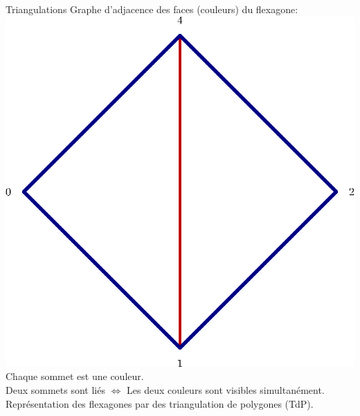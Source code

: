 \documentclass[french,xcolor=dvipsnames]{beamer}
\begin{document}
		\begin{frame}{Triangulations}
			Graphe d'adjacence des faces (couleurs) du flexagone:
			\includegraphics[scale=0.3]{triangu_4.eps}\\
			Chaque sommet est une couleur.\\
			Deux sommets sont liés $\Leftrightarrow$ Les deux couleurs sont visibles simultanément.\\
			Représentation des flexagones par des triangulation de polygones (TdP).
		\end{frame}
		
\end{document}
